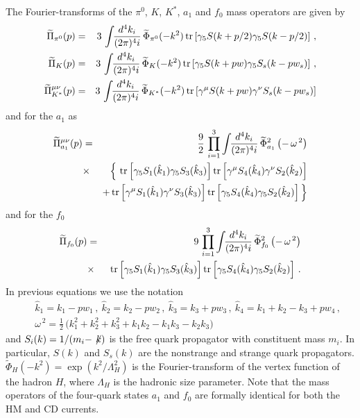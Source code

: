 \documentclass[aps,prd,floatfix,superscriptaddress,showpacs,showkeys]{revtex4}
\newcommand{\bea}{\begin{eqnarray}}
\newcommand{\ena}{\end{eqnarray}}
\newcommand{\nn}{\nonumber\\}
\newcommand{\Tr}{\mbox{\rm{tr}}}
\begin{document}
The Fourier-transforms of the $\pi^0$, $K$, $K^*$, $a_1$ and $f_0$ mass operators  
are given by 
\bea
\widetilde\Pi_{\pi^0}(p) &=& 
3 \,\int\!\!\frac{d^4k_i}{(2\pi)^4i}\,
\widetilde\Phi_{\pi^0}(-k^2) 
\,\Tr\left[\gamma_5  S(k+p/2) \gamma_5 S(k-p/2)  \right]\,, 
\label{eq:pi0-mass}\\
\widetilde\Pi_{K}(p) &=& 
3 \,\int\!\!\frac{d^4k_i}{(2\pi)^4i}\,
\widetilde\Phi_{K}(-k^2) 
\,\Tr\left[\gamma_5  S(k+p w) \gamma_5 S_s(k-p w_s)  \right]\,, 
\label{eq:K-mass}\\
 \widetilde\Pi_{K^*}^{\mu\nu}(p) &=& 
3 \,\int\!\!\frac{d^4k_i}{(2\pi)^4i}\,
\widetilde\Phi_{K^*}(-k^2) 
\,\Tr\left[\gamma^\mu  S(k+p w) \gamma^\nu S_s(k-p w_s)  \right]
\label{eq:Kstar-mass}
\ena
and for the $a_1$ as 
\bea
\widetilde\Pi_{a_1}^{\mu\nu}(p) &=& 
\frac{9}{2}\,\prod\limits_{i=1}^3\int\!\!\frac{d^4k_i}{(2\pi)^4i}\,
\widetilde\Phi_{a_1}^2\left(-\,\omega^{\,2}\right) 
\nn
&\times& \Big\{
%
\,\,\Tr\left[\gamma_5   S_1(\hat k_1) \gamma_5   S_3(\hat k_3) \right]
    \Tr\left[\gamma^\mu S_4(\hat k_4) \gamma^\nu S_2(\hat k_2) \right] 
\nn
&&
+\, \Tr\left[\gamma^\mu S_1(\hat k_1) \gamma^\nu S_3(\hat k_3) \right]
    \Tr\left[\gamma_5   S_4(\hat k_4) \gamma_5   S_2(\hat k_2) \right] 
\Big\}
\label{eq:a1-mass}
\ena
and for the $f_0$
\bea
\widetilde\Pi_{f_0}(p) &=& 
9 \,\prod\limits_{i=1}^3\int\!\!\frac{d^4k_i}{(2\pi)^4i}\,
  \widetilde\Phi_{f_0}^2\left(-\,\omega^{\,2}\right) 
\nn
&\times& 
%
\,\,\Tr\left[\gamma_5   S_1(\hat k_1) \gamma_5   S_3(\hat k_3) \right]
    \Tr\left[\gamma_5   S_4(\hat k_4) \gamma_5   S_2(\hat k_2) \right] \,. 
\label{eq:f0-mass}
\ena
In previous equations we use the notation
\bea 
& &\hat k_1=k_1-p w_1\,, \ 
   \hat k_2=k_2-p w_2\,, \ 
   \hat k_3=k_3+p w_3\,, \
   \hat k_4=k_1+k_2-k_3+p w_4\,, \nn 
& &\omega^{\,2}=\frac{1}{2}\,
\biggl(k_1^2+k_2^2+k_3^2+k_1k_2-k_1k_3-k_2k_3\biggr) 
\ena 
and $S_i(k) = 1/(m_i - \not\! k)$ is the free quark propagator with 
constituent mass $m_i$. In particular, 
$S(k)$ and $S_s(k)$ are the nonstrange and strange quark propagators. 
$\widetilde\Phi_{H}(-k^2) = \exp(k^2/\Lambda_H^2)$ is the Fourier-transform 
of the vertex function of the hadron $H$, where $\Lambda_H$ is the hadronic 
size parameter. 
Note that the mass operators of the four-quark states $a_1$ and $f_0$ 
are formally identical for both the HM and CD currents. 
  
\end{document}
